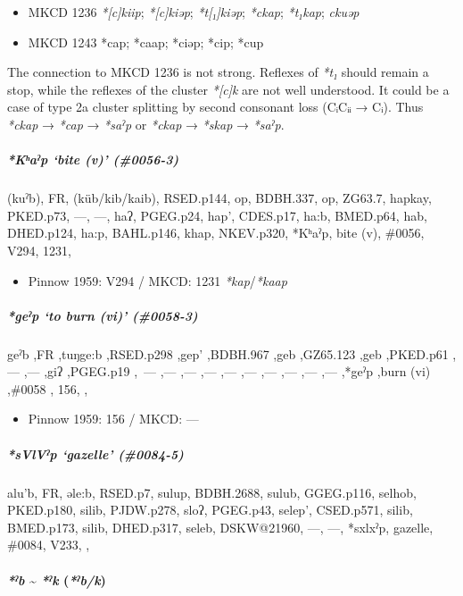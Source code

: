 \documentclass[a4paper,]{article}
\providecommand{\tightlist}{%
  \setlength{\itemsep}{0pt}\setlength{\parskip}{0pt}}
\let\oldparagraph\paragraph
\renewcommand{\paragraph}[1]{\oldparagraph{#1}\mbox{}}
\let\oldsubparagraph\subparagraph
\renewcommand{\subparagraph}[1]{\oldsubparagraph{#1}\mbox{}}
\begin{document}
\begin{itemize}
\tightlist
\item
  MKCD 1236 \emph{*{[}c{]}kiip}; \emph{*{[}c{]}kiəp};
  \emph{*t{[}₁{]}kiəp}; \emph{*ckap}; \emph{*t₁kap}; \emph{ckuəp}
\item
  MKCD 1243 *cap; *caap; *ciəp; *cip; *cup
\end{itemize}

The connection to MKCD 1236 is not strong. Reflexes of \emph{*t₁} should
remain a stop, while the reflexes of the cluster \emph{*{[}c{]}k} are
not well understood. It could be a case of type 2a cluster splitting by
second consonant loss (CᵢCᵢᵢ → Cᵢ). Thus \emph{*ckap} → \emph{*cap} →
\emph{*saˀp} or \emph{*ckap} → \emph{*skap} → \emph{*saˀp}.

\subparagraph{\texorpdfstring{\emph{*Kʰaˀp} `bite (v)'
(\#0056-3)}{*Kʰaˀp bite (v) (\#0056-3)}}\label{kux2b0aux2c0p-bite-v-0056-3}

(kuˀb), FR, (küb/kib/kaib), RSED.p144, op, BDBH.337, op, ZG63.7, hapkay,
PKED.p73, ---, ---, haʔ, PGEG.p24, hap', CDES.p17, ha:b, BMED.p64, hab,
DHED.p124, ha:p, BAHL.p146, khap, NKEV.p320, *Kʰaˀp, bite (v), \#0056,
V294, 1231,

\begin{itemize}
\tightlist
\item
  Pinnow 1959: V294 / MKCD: 1231 \emph{*kap}/\emph{*kaap}
\end{itemize}

\subparagraph{\texorpdfstring{\emph{*geˀp} `to burn (vi)'
(\#0058-3)}{*geˀp to burn (vi) (\#0058-3)}}\label{geux2c0p-to-burn-vi-0058-3}

geˀb ,FR ,tuŋge:b ,RSED.p298 ,gep' ,BDBH.967 ,geb ,GZ65.123 ,geb
,PKED.p61 ,--- ,--- ,giʔ ,PGEG.p19 ,~--- ,--- ,--- ,--- ,--- ,--- ,---
,--- ,--- ,--- ,*geˀp ,burn (vi) ,\#0058 , 156, ,

\begin{itemize}
\tightlist
\item
  Pinnow 1959: 156 / MKCD: ---
\end{itemize}

\subparagraph{\texorpdfstring{\emph{*sVlVˀp} `gazelle'
(\#0084-5)}{*sVlVˀp gazelle (\#0084-5)}}\label{svlvux2c0p-gazelle-0084-5}

alu'b, FR, əle:b, RSED.p7, sulup, BDBH.2688, sulub, GGEG.p116, selhob,
PKED.p180, silib, PJDW.p278, sloʔ, PGEG.p43, selep', CSED.p571, silib,
BMED.p173, silib, DHED.p317, seleb, DSKW@21960, ---, ---, *sxlxˀp,
gazelle, \#0084, V233, ,

\paragraph{\texorpdfstring{\emph{*ˀb} \textasciitilde{} \emph{*ˀk}
(\emph{*ˀb/k})}{*ˀb \textasciitilde{} *ˀk (*ˀb/k)}}\label{ux2c0b-ux2c0k-ux2c0bk}
\end{document}
